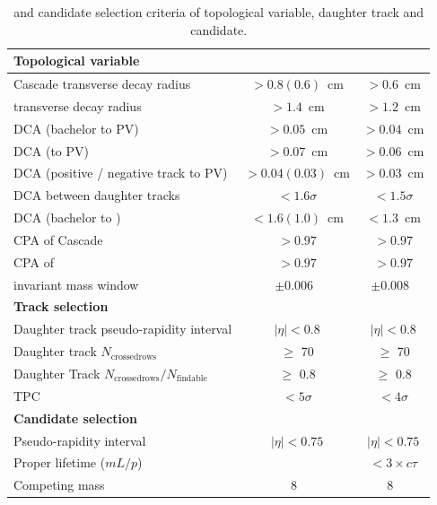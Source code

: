 \begin{table}[!ht]
	\begin{center}
		\caption{\Xis and \Oms candidate selection criteria of topological variable, daughter track and candidate.}
		\label{Tab:CascadeCut}
		\begin{tabularx}{\textwidth}{@{} lCC @{}}
			\toprule
			\textbf{Topological variable} & \textbf{\pp} & \textbf{\pPb} \\
			\midrule
			Cascade transverse decay radius  & $> 0.8(0.6)$~cm      & $> 0.6$~cm \\
			\Vzero transverse decay radius   & $> 1.4$~cm           & $> 1.2$~cm    \\
			DCA (bachelor to PV)             & $> 0.05$~cm          & $> 0.04$~cm   \\
			DCA (\Vzero to PV)               & $> 0.07$~cm          & $> 0.06$~cm   \\
			DCA (positive / negative track to PV) & $> 0.04(0.03)$~cm    & $> 0.03$~cm   \\
			DCA between \Vzero daughter tracks & $< 1.6\sigma$      & $< 1.5\sigma$ \\
			DCA (bachelor to \Vzero)         & $< 1.6(1.0)$~cm      & $< 1.3$~cm \\
			CPA of Cascade                   & $> 0.97$             & $> 0.97$   \\
			CPA of \Vzero                    & $> 0.97$             & $> 0.97$   \\
			\Vzero invariant mass window     & $\pm 0.006$~\GeVmass & $\pm 0.008$~\GeVmass \\
			\midrule
			\textbf{Track selection} \\
			\midrule
			Daughter track pseudo-rapidity interval  &$|\eta| < 0.8$  &$|\eta| < 0.8$  \\
			Daughter track $N_\mathrm{crossed rows}$  &$\geq$ 70   &$\geq$ 70 \\
			Daughter Track $N_\mathrm{crossed rows}/N_\mathrm{findable}$ &$\geq$ 0.8 &$\geq$ 0.8 \\
			TPC \dEdx                & $< 5\sigma$     & $< 4\sigma$\\
			\midrule
			\textbf{Candidate selection} \\
			\midrule
			Pseudo-rapidity interval &$|\eta| < 0.75$  &$|\eta| < 0.75$  \\
			Proper lifetime ($mL/p$) &                 & $< 3 \times c\tau$ \\
			Competing mass           & $8$~\MeVmass     & $8$~\MeVmass \\
			\bottomrule
		\end{tabularx}
	\end{center}
\end{table}
